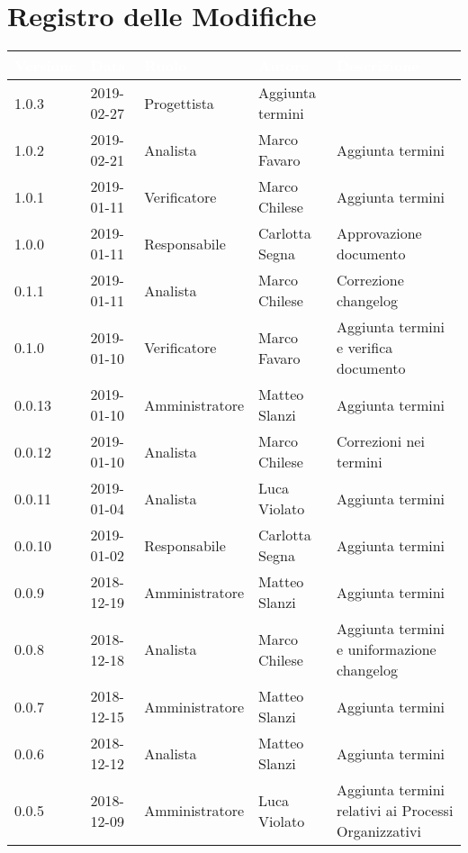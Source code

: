 \section*{Registro delle Modifiche}

\begin{center}
\begin{longtable}[c]{|m{}|m{}|m{}|m{}|p{}|}
\hline
\rowcolor{bluelogo}\textbf{\textcolor{white}{Versione}} & \textbf{\textcolor{white}{Data}} & \textbf{\textcolor{white}{Ruolo}} & \textbf{\textcolor{white}{Autore}} & \textbf{\textcolor{white}{Descrizione}} \\
\hline \hline
\endhead
1.0.3 & 2019-02-27 & Progettista & Aggiunta termini \\
\hline
\rowcolor{grigio}1.0.2 & 2019-02-21 & Analista & Marco Favaro & Aggiunta termini\\
\hline
1.0.1 & 2019-01-11 & Verificatore & Marco Chilese & Aggiunta termini\\
\hline
\rowcolor{grigio}1.0.0 & 2019-01-11 & Responsabile & Carlotta Segna & Approvazione documento \\
\hline
0.1.1 & 2019-01-11 & Analista & Marco Chilese & Correzione changelog\\
\hline
\rowcolor{grigio}0.1.0 & 2019-01-10 & Verificatore & Marco Favaro & Aggiunta termini e verifica documento\\
\hline
0.0.13 & 2019-01-10 & Amministratore & Matteo Slanzi & Aggiunta termini\\
\hline
\rowcolor{grigio}0.0.12 & 2019-01-10 & Analista & Marco Chilese & Correzioni nei termini\\
\hline
0.0.11 & 2019-01-04 & Analista & Luca Violato & Aggiunta termini\\
\hline
\rowcolor{grigio} 0.0.10 & 2019-01-02 & Responsabile & Carlotta Segna & Aggiunta termini\\
\hline
0.0.9 & 2018-12-19 & Amministratore & Matteo Slanzi & Aggiunta termini\\
\hline
\rowcolor{grigio}0.0.8 & 2018-12-18 & Analista & Marco Chilese & Aggiunta termini e uniformazione changelog\\
\hline
0.0.7 & 2018-12-15 & Amministratore & Matteo Slanzi & Aggiunta termini\\
\hline
\rowcolor{grigio}0.0.6 & 2018-12-12 & Analista & Matteo Slanzi & Aggiunta termini\\
\hline
0.0.5 & 2018-12-09 & Amministratore & Luca Violato & Aggiunta termini relativi ai Processi Organizzativi\\

\end{longtable}
\end{center}
